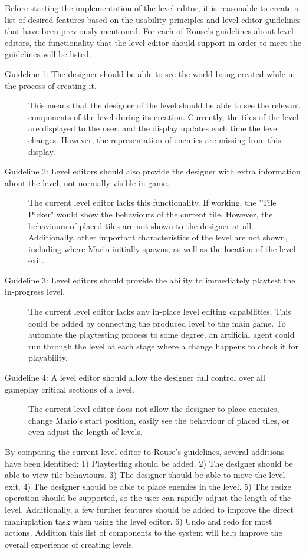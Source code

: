 Before starting the implementation of the level editor, it is reasonable to create a list
of desired features based on the usability principles and level editor guidelines that have
been previously mentioned. For each of Rouse's guidelines about level editors, the
functionality that the level editor should support in order to meet the guidelines will be
listed.

\begin{description}
    \item [Guideline 1: The designer should be able to see the world being created while in the process of creating it.] This means that the designer of the level should be able to see the relevant components of the level during its creation. Currently, the tiles of the level are displayed to the user, and the display updates each time the level changes. However, the representation of enemies are missing from this display.
    \item [Guideline 2: Level editors should also provide the designer with extra information about the level, not normally visible in game.] The current level editor lacks this functionality. If working, the "Tile Picker" would show the behaviours of the current tile. However, the behaviours of placed tiles are not shown to the designer at all. Additionally, other important characteristics of the level are not shown, including where Mario initially spawns, as well as the location of the level exit.
    \item [Guideline 3: Level editors should provide the ability to immediately playtest the in-progress level.] The current level editor lacks any in-place level editing capabilities. This could be added by connecting the produced level to the main game. To automate the playtesting process to some degree, an artificial agent could run through the level at each stage where a change happens to check it for playability.
    \item [Guideline 4: A level editor should allow the designer full control over all gameplay critical sections of a level.] The current level editor does not allow the designer to place enemies, change Mario's start position, easily see the behaviour of placed tiles, or even adjust the length of levels.
\end{description}

By comparing the current level editor to Rouse's guidelines, several additions have been
identified: 1) Playtesting should be added. 2) The designer should be able to view tile 
behaviours. 3) The designer should be able to move the level exit. 4) The designer should
be able to place enemies in the level. 5) The resize operation should be supported, so the
user can rapidly adjust the length of the level. Additionally, a few further features should
be added to improve the direct maniuplation task when using the level editor. 6) Undo and
redo for most actions. Addition this list of components to the system will help improve
the overall experience of creating levels.


